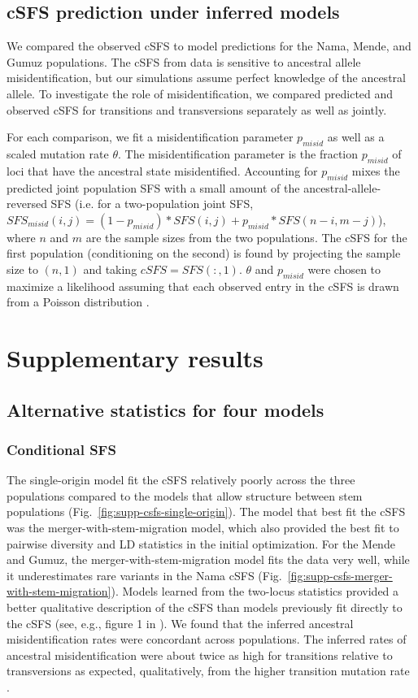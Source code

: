 \documentclass[]{article}
\begin{document}
\subsection{cSFS prediction under inferred models}

We compared the observed cSFS to model predictions for the Nama, Mende, and
Gumuz populations. The cSFS from data is sensitive to ancestral allele
misidentification, but our simulations assume perfect knowledge of the
ancestral allele. To investigate the role of misidentification, we compared
predicted and observed cSFS for transitions and transversions separately as
well as jointly.

For each comparison, we fit a misidentification parameter $p_{misid}$ as well
as a scaled mutation rate $\theta$. The misidentification parameter is the
fraction $p_{misid}$ of loci that have the ancestral state misidentified.
Accounting for $p_{misid}$ mixes the predicted joint population SFS with a
small amount of the ancestral-allele-reversed SFS (i.e. for a two-population
joint SFS, $SFS_{misid}(i, j)=(1-p_{misid})*SFS(i, j) + p_{misid}*SFS(n-i,
m-j)$), where $n$ and $m$ are the sample sizes from the two populations. The
cSFS for the first population (conditioning on the second) is found by
projecting the sample size to $(n, 1)$ and taking $cSFS=SFS(:,1)$. $\theta$ and
$p_{misid}$ were chosen to maximize a likelihood assuming that each observed
entry in the cSFS is drawn from a Poisson distribution \citep{Sawyer1992-rt}.

\section{Supplementary results}

\subsection{Alternative statistics for four models}

\subsubsection{Conditional SFS}
\label{sec:cSFS}
The single-origin model fit the cSFS relatively poorly across the three
populations compared to the models that allow structure between stem
populations (Fig.~\ref{fig:supp-csfs-single-origin}). The model that best fit
the cSFS was the merger-with-stem-migration model, which also provided the best
fit to pairwise diversity and LD statistics in the initial optimization. For
the Mende and Gumuz, the merger-with-stem-migration model fits the data very
well, while it underestimates rare variants in the Nama cSFS
(Fig.~\ref{fig:supp-csfs-merger-with-stem-migration}). Models learned from the
two-locus statistics provided a better qualitative description of the cSFS than
models previously fit directly to the cSFS  (see, e.g., figure 1 in
\citet{Durvasula2020-td}). We found that the inferred ancestral
misidentification rates were concordant across populations. The inferred rates
of ancestral misidentification were about twice as high for transitions
relative to transversions as expected, qualitatively, from the higher
transition mutation rate \citep{Hernandez2007-mf}.
\end{document}
